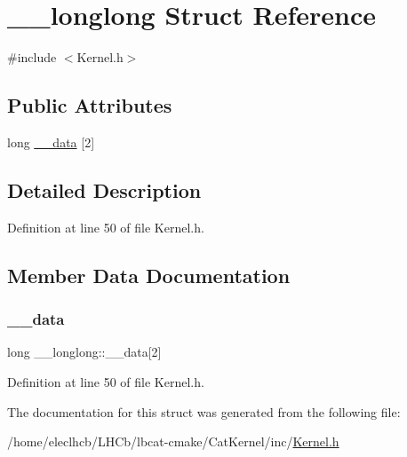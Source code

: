 \hypertarget{struct____longlong}{}\section{\+\_\+\+\_\+longlong Struct Reference}
\label{struct____longlong}


{\ttfamily \#include $<$Kernel.\+h$>$}

\subsection*{Public Attributes}
\begin{DoxyCompactItemize}
\item 
long \hyperlink{struct____longlong_a1ba8dd2a7c85529d3ce8b635d02298d1}{\+\_\+\+\_\+data} \mbox{[}2\mbox{]}
\end{DoxyCompactItemize}


\subsection{Detailed Description}


Definition at line 50 of file Kernel.\+h.



\subsection{Member Data Documentation}
\mbox{\label{struct____longlong_a1ba8dd2a7c85529d3ce8b635d02298d1}} 
\subsubsection{\texorpdfstring{\+\_\+\+\_\+data}{\_\_data}}
{\footnotesize\ttfamily long \+\_\+\+\_\+longlong\+::\+\_\+\+\_\+data\mbox{[}2\mbox{]}}



Definition at line 50 of file Kernel.\+h.



The documentation for this struct was generated from the following file\+:\begin{DoxyCompactItemize}
\item 
/home/eleclhcb/\+L\+H\+Cb/lbcat-\/cmake/\+Cat\+Kernel/inc/\hyperlink{Kernel_8h}{Kernel.\+h}\end{DoxyCompactItemize}
